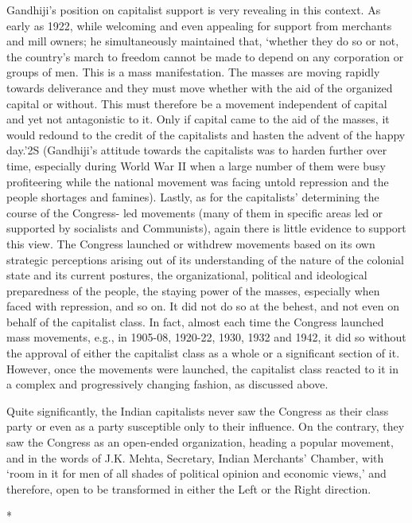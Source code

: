 Gandhiji's position on capitalist support is very revealing in this context. As early as 1922, while welcoming and even appealing for support from merchants and mill owners; he simultaneously maintained that, `whether they do so or not, the country's march to freedom cannot be made to depend on any corporation or groups of men. This is a mass manifestation. The masses are moving rapidly towards deliverance and they must move whether with the aid of the organized capital or without. This must therefore be a movement independent of capital and yet not antagonistic to it. Only if capital came to the aid of the masses, it would redound to the credit of the capitalists and hasten the advent of the happy day.'2S (Gandhiji's attitude towards the capitalists was to harden further over time, especially during World War II when a large number of them were busy profiteering while the national movement was facing untold repression and the people shortages and famines). Lastly, as for the capitalists' determining the course of the Congress- led movements (many of them in specific areas led or supported by socialists and Communists), again there is little evidence to support this view. The Congress launched or withdrew movements based on its own strategic perceptions arising out of its understanding of the nature of the colonial state and its current postures, the organizational, political and ideological preparedness of the people, the staying power of the masses, especially when faced with repression, and so on. It did not do so at the behest, and not even on behalf of the capitalist class. In fact, almost each time the Congress launched mass movements, e.g., in 1905-08, 1920-22, 1930, 1932 and 1942, it did so without the approval of either the capitalist class as a whole or a significant section of it. However, once the movements were launched, the capitalist class reacted to it in a complex and progressively changing fashion, as discussed above. 

Quite significantly, the Indian capitalists never saw the Congress as their class party or even as a party susceptible only to their influence. On the contrary, they saw the Congress as an open-ended organization, heading a popular movement, and in the words of J.K. Mehta, Secretary, Indian Merchants' Chamber, with `room in it for men of all shades of political opinion and economic views,' and therefore, open to be transformed in either the Left or the Right direction.

\begin{center}*\end{center}

